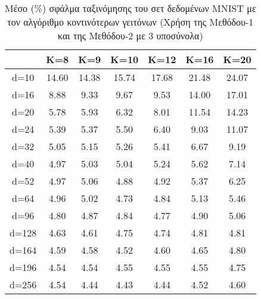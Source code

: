 \begin{table}[H]
\singlespacing
\centering
\label{tab:table9}
\caption{Μέσο (\%) σφάλμα ταξινόμησης του σετ δεδομένων \textlatin{MNIST} με τον αλγόριθμο κοντινότερων γειτόνων (Χρήση της Μεθόδου-1 και της Μεθόδου-2 με 3 υποσύνολα)}
\vspace*{5mm}
\begin{tabular}{|c|c|c|c|c|c|c|}
\hline
& K=8 & K=9 & K=10 & K=12 & K=16 & K=20 \\
\hline
d=10 & 14.60 & 14.38 & 15.74 & 17.68 & 21.48 & 24.07 \\
d=16 & 8.88 & 9.33 & 9.67 & 9.53 & 14.00 & 17.01 \\
d=20 & 5.78 & 5.93 & 6.32 & 8.01 & 11.54 & 14.23 \\
d=24 & 5.39 & 5.37 & 5.50 & 6.40 & 9.03 & 11.07 \\
d=32 & 5.05 & 5.15 & 5.26 & 5.41 & 6.67 & 9.19 \\
d=40 & 4.97 & 5.03 & 5.04 & 5.24 & 5.62 & 7.14 \\
d=52 & 4.97 & 5.06 & 4.88 & 4.92 & 5.37 & 6.25 \\
d=64 & 4.96 & 5.02 & 4.73 & 4.84 & 5.13 & 5.46 \\
d=96 & 4.80 & 4.87 & 4.84 & 4.77 & 4.90 & 5.06 \\
d=128 & 4.63 & 4.61 & 4.75 & 4.74 & 4.81 & 4.81 \\
d=164 & 4.59 & 4.58 & 4.52 & 4.60 & 4.65 & 4.80 \\
d=196 & 4.54 & 4.54 & 4.55 & 4.55 & 4.55 & 4.75 \\
d=256 & 4.54 & 4.44 & 4.43 & 4.44 & 4.52 & 4.60 \\
\hline
\end{tabular}
\end{table}

